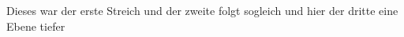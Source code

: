 \ea
  \ea Dieses war der erste Streich
  \ex  und der zweite folgt sogleich
    \ea und hier der dritte eine Ebene tiefer
    \z
  \z
\z
